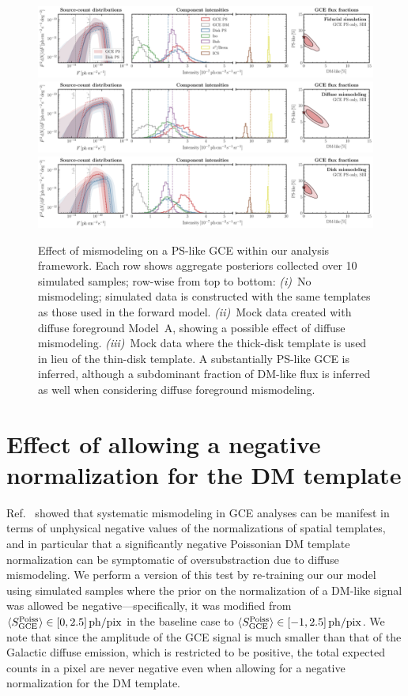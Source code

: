\documentclass[prd,aps,10pt,nofootinbib,twocolumn,superscriptaddress,preprintnumbers,balancelastpage,longbibliography,floatfix]{revtex4-2}
\begin{document}
%
\begin{figure}[!htbp]
\centering
\includegraphics[width=1.\textwidth]{plots/sim_sbi_ps_agg.pdf}
\includegraphics[width=1.\textwidth]{plots/sim_sbi_modelA_ps.pdf}
\includegraphics[width=1.\textwidth]{plots/sim_sbi_thick_disk_mm_ps.pdf}
\caption{Effect of mismodeling on a PS-like GCE within our analysis framework. Each row shows aggregate posteriors collected over 10 simulated samples; row-wise from top to bottom: \emph{(i)}~No mismodeling; simulated data is constructed with the same templates as those used in the forward model. \emph{(ii)}~Mock data created with diffuse foreground {Model~A}, showing a possible effect of diffuse mismodeling. \emph{(iii)}~Mock data where the thick-disk template is used in lieu of the thin-disk template. A substantially PS-like GCE is inferred, although a subdominant fraction of DM-like flux is inferred as well when considering diffuse foreground mismodeling.}
\label{fig:sim_sbi_mismo_ps}
\end{figure}
%

\section{Effect of allowing a negative normalization for the DM template}
\label{app:negative_dm}

Ref.~\cite{Leane:2019xiy} showed that systematic mismodeling in GCE analyses can be manifest in terms of unphysical negative values of the normalizations of spatial templates, and in particular that a significantly negative Poissonian DM template normalization can be symptomatic of oversubstraction due to diffuse mismodeling. We perform a version of this test by re-training our our model using simulated samples where the prior on the normalization of a DM-like signal was allowed be negative---specifically, it was modified from $\langle S_{\rm GCE}^{\rm Poiss} \rangle \in [0, 2.5]\,\mathrm{ph/pix}$ in the baseline case to  $\langle S_{\rm GCE}^{\rm Poiss} \rangle \in [-1, 2.5]\,\mathrm{ph/pix}$. We note that since the amplitude of the GCE signal is much smaller than that of the Galactic diffuse emission, which is restricted to be positive, the total expected counts in a pixel are never negative even when allowing for a negative normalization for the DM template.
\end{document}
